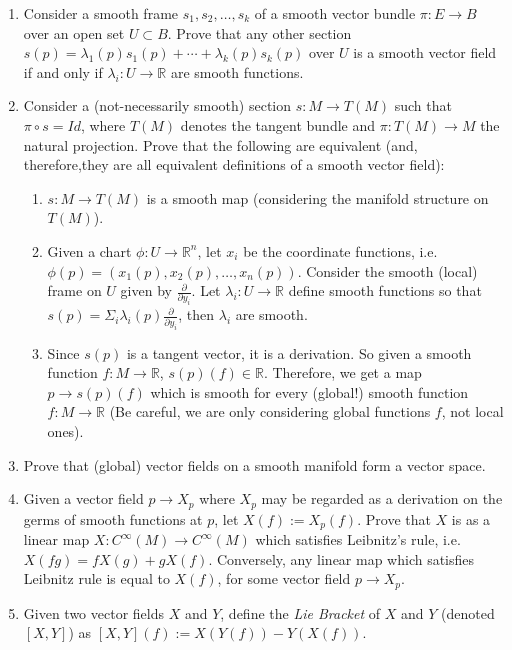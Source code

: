 \begin{enumerate}
  \item Consider a smooth frame $s_1, s_2, \ldots, s_k$ of a smooth vector bundle $\pi : E \to B$ over an open set $U \subset B$. Prove that any other section $s(p) = \lambda_1(p) s_1(p) + \cdots + \lambda_k(p) s_k(p)$ over $U$ is a smooth vector field if and only if $\lambda_i : U \to \mathbb{R}$  are smooth functions.
\item Consider a (not-necessarily smooth) section $s : M \to T(M)$ such that $\pi \circ s = Id$, where $T(M)$ denotes the tangent bundle and $\pi : T(M) \to M$ the natural projection. Prove that the following are equivalent (and, therefore,they are all equivalent definitions of a smooth vector field):
  \begin{enumerate}
  \item $s : M \to T(M)$ is a smooth map (considering the manifold structure on $T(M)$).
    \item Given a chart $\phi : U \to \mathbb{R}^n$, let $x_i$ be the coordinate functions, i.e. $\phi(p) = (x_1(p), x_2(p), \ldots, x_n(p))$. Consider the smooth (local)  frame on $U$ given by $\frac{\partial}{\partial y_i}$. Let $\lambda_i : U \to \mathbb{R}$ define smooth functions so that $s(p) = \Sigma_i \lambda_i(p)\frac{\partial}{\partial y_i} $, then $\lambda_i$ are smooth.
      \item Since $s(p)$ is a tangent vector, it is a derivation. So given a smooth function $f : M\to \mathbb{R}$, $s(p)(f)\in \mathbb{R}$. Therefore, we get a map $p \to s(p)(f)$ which is smooth for every (global!) smooth function $f : M \to \mathbb{R}$ (Be careful, we are only considering global functions $f$, not local ones).
  \end{enumerate}
  \item Prove that (global) vector fields on a smooth manifold form a vector space.
  \item Given a vector field $p \to X_p$ where $X_p$ may be regarded as a derivation on the germs of smooth functions at $p$, let $X(f) := X_p(f)$. Prove that $X$ is as a linear map $X : C^\infty(M) \to C^\infty(M)$ which satisfies Leibnitz's rule, i.e. $X(fg) = fX(g) + g X(f)$. Conversely, any linear map which satisfies Leibnitz rule is equal to $X(f)$, for some vector field $p \to X_p$.
  \item Given two vector fields $X$ and $Y$, define the \emph{Lie Bracket} of $X$ and $Y$ (denoted $[X,Y]$) as $[X, Y](f) := X(Y(f)) - Y (X (f))$.
    \begin{enumerate}

\end{enumerate}
\end{enumerate}
